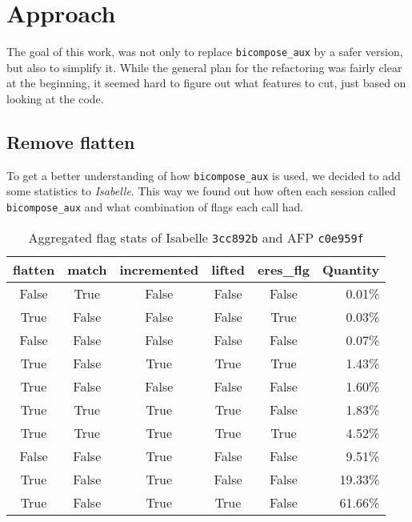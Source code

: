 \chapter{Approach}\label{chapter:approach}

The goal of this work, was not only to replace \texttt{bicompose\_aux} by a safer version, but also to simplify it. While the general plan for the refactoring was fairly clear at the beginning, it seemed hard to figure out what features to cut, just based on looking at the code.

\section{Remove flatten}

To get a better understanding of how \texttt{bicompose\_aux} is used, we decided to add some statistics to \textit{Isabelle}. This way we found out how often each session called \texttt{bicompose\_aux} and what combination of flags each call had.

\begin{table}[ht]
\caption{Aggregated flag stats of Isabelle \texttt{3cc892b} and AFP \texttt{c0e959f}}
\begin{tabular}{*{5}{c} r}
flatten & match & incremented & lifted & eres\_flg & Quantity\\ \hline
False & True & False & False & False & 0.01\%\\
True & False & False & False & True & 0.03\%\\
False & False & False & False & False & 0.07\%\\
True & False & True & True & True & 1.43\%\\
True & False & False & False & False & 1.60\%\\
True & True & True & True & False & 1.83\%\\
True & True & True & True & True & 4.52\%\\
False & False & True & False & False & 9.51\%\\
True & False & True & False & False & 19.33\%\\
True & False & True & True & False & 61.66\%\\
\end{tabular}
\label{tab:agg_baseline}
\centering
\end{table}

